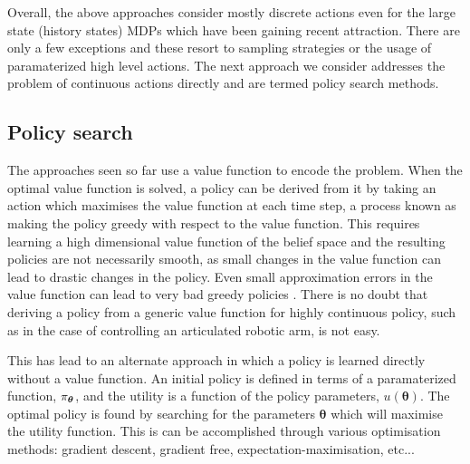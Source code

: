Overall, the above approaches consider mostly discrete actions even for the large state (history states) MDPs
which have been gaining recent attraction. There are only a few exceptions and these resort to sampling strategies 
or the usage of paramaterized high level actions. The next approach we consider addresses the problem of continuous
actions directly and are termed policy search methods.

\subsection{Policy search}\label{lit:policy_search}

The approaches seen so far use a value function to encode the problem. When the optimal value function is solved, a policy can be derived from it by taking an action which maximises the value function at each time step, a process known as making the policy greedy with respect to the value function. This requires learning a high dimensional value function of the belief space and the resulting policies are not necessarily 
smooth, as small changes in the value function can lead to drastic changes in the policy. Even small 
approximation errors in the value function can lead to very bad greedy policies \cite{gpomdp_2000}. 
There is no doubt that deriving a policy from a generic value function for highly continuous policy, such as in the case 
of controlling an articulated robotic arm, is not easy. 

This has lead to an alternate approach in which a policy is learned directly without a value function. An 
initial policy is defined in terms of a paramaterized function, $\operatorname{\pi_{\boldsymbol{\theta}}}$, and the utility is a function of the 
policy parameters, $u(\boldsymbol{\theta})$. The optimal policy is found by searching for the parameters $\boldsymbol{\theta}$ which 
will maximise the utility function. This is can be accomplished through various optimisation methods: gradient descent, gradient free, 
expectation-maximisation, etc...

